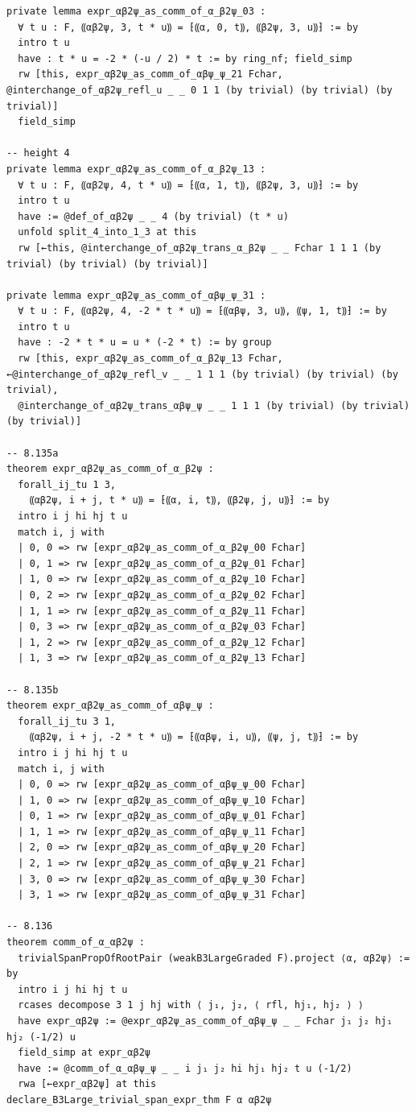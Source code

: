 \documentclass[10pt,a4paper]{article}
\begin{document}
\begin{Verbatim}
private lemma expr_αβ2ψ_as_comm_of_α_β2ψ_03 :
  ∀ t u : F, ⸨αβ2ψ, 3, t * u⸩ = ⁅⸨α, 0, t⸩, ⸨β2ψ, 3, u⸩⁆ := by
  intro t u
  have : t * u = -2 * (-u / 2) * t := by ring_nf; field_simp
  rw [this, expr_αβ2ψ_as_comm_of_αβψ_ψ_21 Fchar, @interchange_of_αβ2ψ_refl_u _ _ 0 1 1 (by trivial) (by trivial) (by trivial)]
  field_simp

-- height 4
private lemma expr_αβ2ψ_as_comm_of_α_β2ψ_13 :
  ∀ t u : F, ⸨αβ2ψ, 4, t * u⸩ = ⁅⸨α, 1, t⸩, ⸨β2ψ, 3, u⸩⁆ := by
  intro t u
  have := @def_of_αβ2ψ _ _ 4 (by trivial) (t * u)
  unfold split_4_into_1_3 at this
  rw [←this, @interchange_of_αβ2ψ_trans_α_β2ψ _ _ Fchar 1 1 1 (by trivial) (by trivial) (by trivial)]

private lemma expr_αβ2ψ_as_comm_of_αβψ_ψ_31 :
  ∀ t u : F, ⸨αβ2ψ, 4, -2 * t * u⸩ = ⁅⸨αβψ, 3, u⸩, ⸨ψ, 1, t⸩⁆ := by
  intro t u
  have : -2 * t * u = u * (-2 * t) := by group
  rw [this, expr_αβ2ψ_as_comm_of_α_β2ψ_13 Fchar, ←@interchange_of_αβ2ψ_refl_v _ _ 1 1 1 (by trivial) (by trivial) (by trivial),
  @interchange_of_αβ2ψ_trans_αβψ_ψ _ _ 1 1 1 (by trivial) (by trivial) (by trivial)]

-- 8.135a
theorem expr_αβ2ψ_as_comm_of_α_β2ψ :
  forall_ij_tu 1 3,
    ⸨αβ2ψ, i + j, t * u⸩ = ⁅⸨α, i, t⸩, ⸨β2ψ, j, u⸩⁆ := by
  intro i j hi hj t u
  match i, j with
  | 0, 0 => rw [expr_αβ2ψ_as_comm_of_α_β2ψ_00 Fchar]
  | 0, 1 => rw [expr_αβ2ψ_as_comm_of_α_β2ψ_01 Fchar]
  | 1, 0 => rw [expr_αβ2ψ_as_comm_of_α_β2ψ_10 Fchar]
  | 0, 2 => rw [expr_αβ2ψ_as_comm_of_α_β2ψ_02 Fchar]
  | 1, 1 => rw [expr_αβ2ψ_as_comm_of_α_β2ψ_11 Fchar]
  | 0, 3 => rw [expr_αβ2ψ_as_comm_of_α_β2ψ_03 Fchar]
  | 1, 2 => rw [expr_αβ2ψ_as_comm_of_α_β2ψ_12 Fchar]
  | 1, 3 => rw [expr_αβ2ψ_as_comm_of_α_β2ψ_13 Fchar]

-- 8.135b
theorem expr_αβ2ψ_as_comm_of_αβψ_ψ :
  forall_ij_tu 3 1,
    ⸨αβ2ψ, i + j, -2 * t * u⸩ = ⁅⸨αβψ, i, u⸩, ⸨ψ, j, t⸩⁆ := by
  intro i j hi hj t u
  match i, j with
  | 0, 0 => rw [expr_αβ2ψ_as_comm_of_αβψ_ψ_00 Fchar]
  | 1, 0 => rw [expr_αβ2ψ_as_comm_of_αβψ_ψ_10 Fchar]
  | 0, 1 => rw [expr_αβ2ψ_as_comm_of_αβψ_ψ_01 Fchar]
  | 1, 1 => rw [expr_αβ2ψ_as_comm_of_αβψ_ψ_11 Fchar]
  | 2, 0 => rw [expr_αβ2ψ_as_comm_of_αβψ_ψ_20 Fchar]
  | 2, 1 => rw [expr_αβ2ψ_as_comm_of_αβψ_ψ_21 Fchar]
  | 3, 0 => rw [expr_αβ2ψ_as_comm_of_αβψ_ψ_30 Fchar]
  | 3, 1 => rw [expr_αβ2ψ_as_comm_of_αβψ_ψ_31 Fchar]

-- 8.136
theorem comm_of_α_αβ2ψ :
  trivialSpanPropOfRootPair (weakB3LargeGraded F).project ⟨α, αβ2ψ⟩ := by
  intro i j hi hj t u
  rcases decompose 3 1 j hj with ⟨ j₁, j₂, ⟨ rfl, hj₁, hj₂ ⟩ ⟩
  have expr_αβ2ψ := @expr_αβ2ψ_as_comm_of_αβψ_ψ _ _ Fchar j₁ j₂ hj₁ hj₂ (-1/2) u
  field_simp at expr_αβ2ψ
  have := @comm_of_α_αβψ_ψ _ _ i j₁ j₂ hi hj₁ hj₂ t u (-1/2)
  rwa [←expr_αβ2ψ] at this
declare_B3Large_trivial_span_expr_thm F α αβ2ψ


\end{Verbatim}
\end{document}
